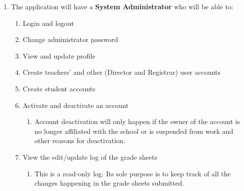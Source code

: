 \documentclass[11pt,a4paper,titlepage]{article}
\begin{document}
\begin{enumerate}
	\item The application will have a \textbf{System Administrator} who will be able to:
	\begin{enumerate}
		\item Login and logout
		\item Change administrator password
		\item View and update profile
		\item Create teachers' and other (Director and Registrar) user accounts
		\item Create student accounts
        \item Activate and deactivate an account 
        \begin{enumerate}
            \item Account deactivation will only happen if the owner of the account is no longer affiliated with the school or is suspended from work and other reasons for deactivation.
        \end{enumerate}
		\item View the edit/update log of the grade sheets
		\begin{enumerate}
            \item This is a read-only log. Its sole purpose is to keep track of all the changes happening in the grade sheets submitted.
        \end{enumerate}

	\end{enumerate}
	

\end{enumerate}
\end{document}
